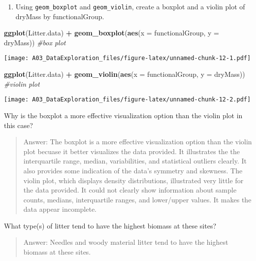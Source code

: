 \documentclass[]{article}
\newenvironment{Shaded}{\begin{snugshade}}{\end{snugshade}}
\newcommand{\CommentTok}[1]{\textcolor[rgb]{0.56,0.35,0.01}{\textit{#1}}}
\newcommand{\DataTypeTok}[1]{\textcolor[rgb]{0.13,0.29,0.53}{#1}}
\newcommand{\KeywordTok}[1]{\textcolor[rgb]{0.13,0.29,0.53}{\textbf{#1}}}
\newcommand{\NormalTok}[1]{#1}
\newcommand{\OperatorTok}[1]{\textcolor[rgb]{0.81,0.36,0.00}{\textbf{#1}}}
\newcommand{\StringTok}[1]{\textcolor[rgb]{0.31,0.60,0.02}{#1}}
\providecommand{\tightlist}{%
  \setlength{\itemsep}{0pt}\setlength{\parskip}{0pt}}
\begin{document}
\begin{enumerate}
\def\labelenumi{\arabic{enumi}.}
\setcounter{enumi}{14}
\tightlist
\item
  Using \texttt{geom\_boxplot} and \texttt{geom\_violin}, create a
  boxplot and a violin plot of dryMass by functionalGroup.
\end{enumerate}

\begin{Shaded}
\begin{Highlighting}[]
\KeywordTok{ggplot}\NormalTok{(Litter.data) }\OperatorTok{+}
\StringTok{  }\KeywordTok{geom_boxplot}\NormalTok{(}\KeywordTok{aes}\NormalTok{(}\DataTypeTok{x =}\NormalTok{ functionalGroup, }\DataTypeTok{y =}\NormalTok{ dryMass)) }\CommentTok{#box plot}
\end{Highlighting}
\end{Shaded}

\texttt{[image: A03\_DataExploration\_files/figure-latex/unnamed-chunk-12-1.pdf]}

\begin{Shaded}
\begin{Highlighting}[]
\KeywordTok{ggplot}\NormalTok{(Litter.data) }\OperatorTok{+}
\StringTok{  }\KeywordTok{geom_violin}\NormalTok{(}\KeywordTok{aes}\NormalTok{(}\DataTypeTok{x =}\NormalTok{ functionalGroup, }\DataTypeTok{y =}\NormalTok{ dryMass)) }\CommentTok{#violin plot}
\end{Highlighting}
\end{Shaded}

\texttt{[image: A03\_DataExploration\_files/figure-latex/unnamed-chunk-12-2.pdf]}

Why is the boxplot a more effective visualization option than the violin
plot in this case?

\begin{quote}
Answer: The boxplot is a more effective visualization option than the
violin plot becuase it better visualizes the data provided. It
illustrates the the interquartile range, median, variabilities, and
statistical outliers clearly. It also provides some indication of the
data's symmetry and skewness. The violin plot, which displays density
distributions, illustrated very little for the data provided. It could
not clearly show information about sample counts, medians, interquartile
ranges, and lower/upper values. It makes the data appear incomplete.
\end{quote}

What type(s) of litter tend to have the highest biomass at these sites?

\begin{quote}
Answer: Needles and woody material litter tend to have the highest
biomass at these sites.
\end{quote}
\end{document}
